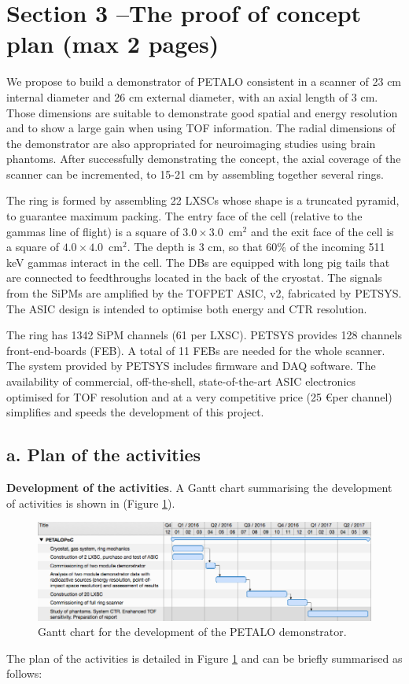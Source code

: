 \documentclass[11pt,a4paper]{article}
\begin{document}
\section*{\bf \textsf{Section 3 --The proof of concept plan (max 2 pages)}}

We propose to build a demonstrator of PETALO consistent in a  scanner of 23 cm internal diameter and 26 cm external diameter, with an axial length of 3 cm. Those dimensions are suitable to demonstrate good spatial and energy resolution and to show a large gain when using TOF information. 
The radial dimensions of the demonstrator are also appropriated  for neuroimaging studies using brain phantoms. After successfully demonstrating the concept, the axial coverage of the scanner can be incremented, to 15-21 cm by assembling together several rings. 
 
The ring is formed by assembling 22 LXSCs whose shape is a truncated pyramid, to guarantee maximum packing. The entry face of the cell (relative to the gammas line of flight) is a square of $3.0 \times 3.0$~cm$^2$ and the exit face of the cell is a square of  $4.0 \times 4.0$~cm$^2$. The depth is 3 cm, so that 60\% of the incoming 511 keV gammas interact in the cell.
The DBs are equipped with long pig tails that are connected to feedthroughs located in the back of the cryostat.  The signals from the SiPMs are amplified by the TOFPET ASIC, v2, fabricated by PETSYS. The ASIC design is intended to optimise both energy and CTR resolution. 

The ring has 1342 SiPM channels (61 per LXSC). PETSYS provides 128 channels front-end-boards (FEB). A total of 11 FEBs are needed for the whole scanner. The system provided by PETSYS includes firmware and DAQ software. The availability of commercial, off-the-shell, state-of-the-art ASIC electronics optimised for TOF resolution and at a very competitive price (25 \euro per channel) simplifies and speeds the development of this project.  


\subsection*{a. Plan of the activities}
{\bf Development of the activities}. A Gantt chart summarising the development of activities is shown in (Figure \ref{fig.pmp}). 

\begin{figure}[!htb]
	\centering
	\includegraphics[width=.8\textwidth]{img/pmp.png}
	\caption{\label{fig.pmp} Gantt chart for the development of the PETALO demonstrator.}
\end{figure}
The plan of the activities is detailed in Figure \ref{fig.pmp} and can be briefly summarised as follows: 
\end{document}
